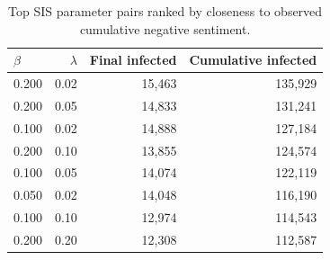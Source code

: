 \begin{table}[t]
\centering
\caption{Top SIS parameter pairs ranked by closeness to observed cumulative negative sentiment.}
\label{tab:sis}
\begin{tabular}{lrrr}
\toprule
$\beta$ & $\lambda$ & Final infected & Cumulative infected \\
\midrule
0.200 & 0.02 & 15,463 & 135,929 \\
0.200 & 0.05 & 14,833 & 131,241 \\
0.100 & 0.02 & 14,888 & 127,184 \\
0.200 & 0.10 & 13,855 & 124,574 \\
0.100 & 0.05 & 14,074 & 122,119 \\
0.050 & 0.02 & 14,048 & 116,190 \\
0.100 & 0.10 & 12,974 & 114,543 \\
0.200 & 0.20 & 12,308 & 112,587 \\
\bottomrule
\end{tabular}
\end{table}

